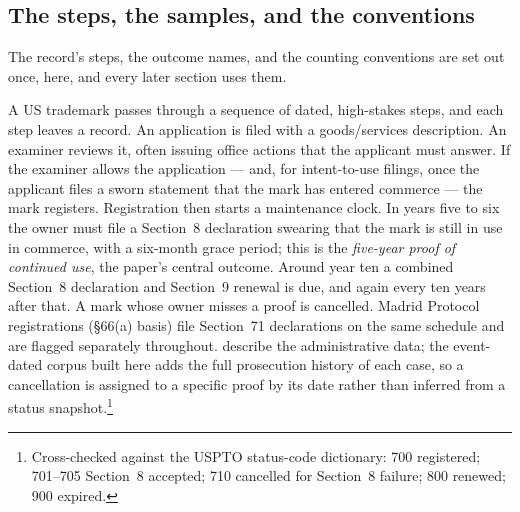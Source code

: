 \subsection{The steps, the samples, and the conventions}\label{sec:gates}

The record's steps, the outcome names, and the counting conventions are
set out once, here, and every later section uses them.

A US trademark passes through a sequence of dated, high-stakes steps, and
each step leaves a record. An application is filed with a goods/services
description. An examiner reviews it, often issuing office actions that
the applicant must answer. If the examiner allows the application ---
and, for intent-to-use filings, once the applicant files a sworn
statement that the mark has entered commerce --- the mark registers.
Registration then starts a maintenance clock. In years five to six the
owner must file a Section~8 declaration swearing that the mark is still
in use in commerce, with a six-month grace period; this is the
\emph{five-year proof of continued use}, the paper's central outcome.
Around year ten a combined Section~8 declaration and Section~9 renewal
is due, and again every ten years after that. A mark whose owner misses
a proof is cancelled. Madrid Protocol
registrations (\S66(a) basis) file Section~71 declarations on the same
schedule and are flagged separately throughout. \citet{Graham2013}
describe the administrative data; the event-dated corpus built here adds
the full prosecution history of each case, so a cancellation is assigned
to a specific proof by its date rather than inferred from a status
snapshot.\footnote{Cross-checked against the USPTO status-code dictionary:
700 registered; 701--705 Section~8 accepted; 710 cancelled for Section~8
failure; 800 renewed; 900 expired.}

